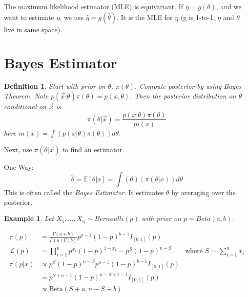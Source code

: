 \documentclass[10pt]{article}
\newtheorem{definition}[def]{Definition}
\newtheorem{example}[ex]{Example}
\newcommand{\Expect}[1]{\mathbb{E}\!\left[#1\right]}
\renewcommand{\hat}{\widehat}
\begin{document}
The maximum likelihood estimator (MLE) is equivariant. If $\eta =
g(\theta)$, and we want to estimate $\eta$, we use $\hat{\eta} =
g(\hat{\theta})$. It is the MLE for $\eta$ (g is 1-to-1, $\eta$ and
$\theta$ live in same space). 

\section{Bayes Estimator}
\label{sec:bayes-estimator}
\begin{definition}
  Start with prior on $\theta$, $\pi(\theta)$. Compute posterior by
  using Bayes Theorem. Note $p(\vec{x}|\theta)\pi(\theta) =
  p(x,\theta)$. Then the {\em posterior distribution} on $\theta$
  conditional on $\vec{x}$ is
  \begin{equation}
    \pi(\theta|\vec{x}) = \frac{p(x|\theta)\pi(\theta)}{m(x)}
  \end{equation}
  here $m(x) = \int(p(x|\theta)\pi(\theta))d\theta$.
\end{definition}

Next, use $\pi(\theta|\vec{x})$ to find an estimator.

One Way: 
\begin{equation}
  \hat{\theta} = \Expect{\theta|x} = \int(\theta)(\pi(\theta|x))d\theta
\end{equation}
This is often called the {\em Bayes Estimator}. It estimates $\theta$
by averaging over the posterior.

\begin{example}
  Let $X_1,\ldots,X_n\sim Bernoulli(p)$ with prior on $p\sim
  Beta(a,b)$.

  \begin{align*}
    \pi(p) &=
    \frac{\Gamma{(a+b)}}{\Gamma{(a)}\Gamma{(b)}}p^{a-1}(1-p)^{b-1}I_{[0,1]}(p)\\
    \mathcal{L}(p) &= \prod_{i=1}^{n}p^{x_i}(1-p)^{1-x_i} =
    p^{S}(1-p)^{n-S} &\mbox{where } S = \sum_{i=1}^{n}x_i\\
    \pi(p|x)&\propto p^{S}(1-p)^{n-S}p^{a-1}(1-p)^{b-1}I_{[0,1]}(p)\\
    &= p^{S+a-1}(1-p)^{n-S+b-1}I_{[0,1]}(p)\\
    &\propto \mbox{Beta}(S+a,n-S+b)
  \end{align*}
\end{example}
\end{document}
